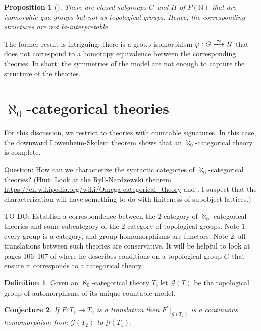 \documentclass[12pt]{article}
\newtheorem{prop}{Proposition}
\newtheorem{conj}[prop]{Conjecture}
\theoremstyle{definition}
\newtheorem*{defn}{Definition}
\theoremstyle{remark}
\newcommand{\3}{\mathcal}
\begin{document}
\begin{prop}[\cite{evans1990}] There are closed subgroups $G$ and $H$
  of $P(\mathbb{N})$ that are isomorphic qua groups but not as
  topological groups. Hence, the corresponding structures are not
  bi-interpretable. \end{prop}

The former result is intriguing: there is a group isomorphism
$\varphi :G\xlongrightarrow{\sim} H$ that does not correspond to a
homotopy equivalence between the corresponding theories. In short: the
symmetries of the model are not enough to capture the structure of the
theories.

\section{$\aleph _0$-categorical theories}

For this discussion, we restrict to theories with countable
signatures. In this case, the downward L{\"o}wenheim-Skolem theorem
shows that an $\aleph _0$-categorical theory is complete.

Question: How can we characterize the syntactic categories of
$\aleph _0$-categorical theories? (Hint: Look at the Ryll-Nardzewski
theorem \url{https://en.wikipedia.org/wiki/Omega-categorical_theory}
and \citep[p 30]{cameron1990}. I suspect that the characterization
will have something to do with finiteness of subobject lattices.)

TO DO: Establish a correspondence between the $2$-category of
$\aleph _0$-categorical theories and some subcategory of the
$2$-category of topological groups. Note 1: every group is a category,
and group homomorphisms are functors.  Note 2: all translations
between such theories are conservative. It will be helpful to look at
pages 106--107 of \citep{cameron1990} where he describes conditions on
a topological group $G$ that ensure it corresponds to a categorical
theory.



\begin{defn} Given an $\aleph _0$-categorical theory $T$, let
  $\3G (T)$ be the topological group of automorphisms of its unique
  countable model. \end{defn}

\begin{conj} If $F:T_1\to T_2$ is a translation then
  $F^*|_{\3G (T_2)}$ is a continuous homomorphism from $\3G (T_2 )$ to
  $\3G (T_1)$. \end{conj}
\end{document}
